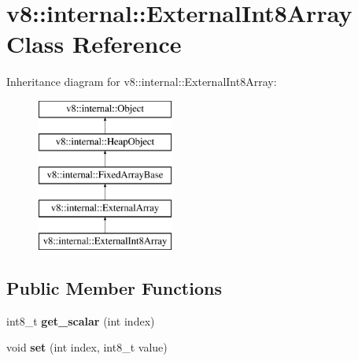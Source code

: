\hypertarget{classv8_1_1internal_1_1_external_int8_array}{}\section{v8\+:\+:internal\+:\+:External\+Int8\+Array Class Reference}
\label{classv8_1_1internal_1_1_external_int8_array}
Inheritance diagram for v8\+:\+:internal\+:\+:External\+Int8\+Array\+:\begin{figure}[H]
\begin{center}
\leavevmode
\includegraphics[height=5.000000cm]{classv8_1_1internal_1_1_external_int8_array}
\end{center}
\end{figure}
\subsection*{Public Member Functions}
\begin{DoxyCompactItemize}
\item 
\hypertarget{classv8_1_1internal_1_1_external_int8_array_ab5e9e157b8e0b68493c6c487b7484dd9}{}int8\+\_\+t {\bfseries get\+\_\+scalar} (int index)\label{classv8_1_1internal_1_1_external_int8_array_ab5e9e157b8e0b68493c6c487b7484dd9}

\item 
\hypertarget{classv8_1_1internal_1_1_external_int8_array_a8cfb96d900a794c3f5562e34f606e5a6}{}void {\bfseries set} (int index, int8\+\_\+t value)\label{classv8_1_1internal_1_1_external_int8_array_a8cfb96d900a794c3f5562e34f606e5a6}

\end{DoxyCompactItemize}
